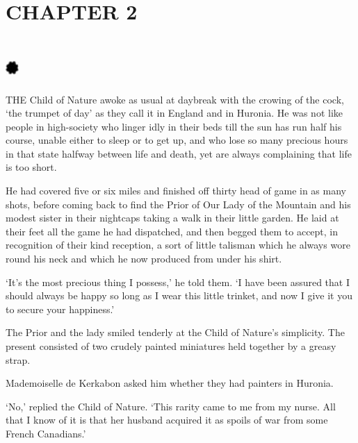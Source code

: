 \documentclass{article}
\begin{document}
\begin{center}
\section*{\textbf{CHAPTER 2 }}

\section*{%
\includegraphics[width=14pt, height=15pt, keepaspectratio=true]{Zadig or L'Ingenu - Voltaire-fig024.jpg}
}

 

THE Child of Nature awoke as usual at daybreak with the crowing of the cock, `the 
trumpet of day' as they call it in England and in Huronia. He was not like people 
in high-society who linger idly in their beds till the sun has run half his course, 
unable either to sleep or to get up, and who lose so many precious hours in that 
state halfway between life and death, yet are always complaining that life is too 
short. 

He had covered five or six miles and finished off thirty head of game in as many 
shots, before coming back to find the Prior of Our Lady of the Mountain and his 
modest sister in their nightcaps taking a walk in their little garden. He laid 
at their feet all the game he had dispatched, and then begged them to accept, in 
recognition of their kind reception, a sort of little talisman which he always 
wore round his neck and which he now produced from under his shirt. 

`It's the most precious thing I possess,' he told them. `I have been assured that 
I should always be happy so long as I wear this little trinket, and now I give 
it you to secure your happiness.' 

The Prior and the lady smiled tenderly at the Child of Nature's simplicity. The 
present consisted of two crudely painted miniatures held together by a greasy strap. 

Mademoiselle de Kerkabon asked him whether they had painters in Huronia. 

`No,' replied the Child of Nature. `This rarity came to me from my nurse. All that 
I know of it is that her husband acquired it as spoils of war from some French 
Canadians.' 


\end{center}
\end{document}
